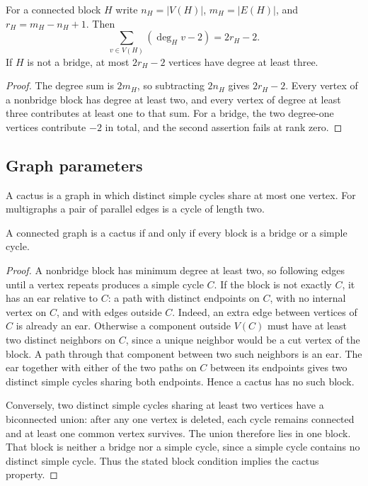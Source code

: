 \begin{lemma}
\label{lem:a-pre-degree}
For a connected block $H$ write $n_H=|V(H)|$, $m_H=|E(H)|$, and
$r_H=m_H-n_H+1$. Then
\[
 \sum_{v\in V(H)}(\deg_H v-2)=2r_H-2.
\]
If $H$ is not a bridge, at most $2r_H-2$ vertices have degree at least three.
\end{lemma}
\begin{proof}
The degree sum is $2m_H$, so subtracting $2n_H$ gives $2r_H-2$.
Every vertex of a nonbridge block has degree at least two, and every
vertex of degree at least three contributes at least one to that sum.
For a bridge, the two degree-one vertices contribute $-2$ in total,
and the second assertion fails at rank zero.
\end{proof}

\subsection{Graph parameters}
\label{subsec:a-pre-parameters}
A cactus is a graph in which distinct simple cycles share at most one
vertex. For multigraphs a pair of parallel edges is a cycle of length two.

\begin{lemma}
\label{lem:a-pre-cactus-blocks}
A connected graph is a cactus if and only if every block is a bridge
or a simple cycle.
\end{lemma}
\begin{proof}
A nonbridge block has minimum degree at least two, so following edges
until a vertex repeats produces a simple cycle $C$. If the block is
not exactly $C$, it has an ear relative to $C$: a path with distinct
endpoints on $C$, with no internal vertex on $C$, and with edges outside
$C$. Indeed, an extra edge between vertices of $C$ is already an
ear. Otherwise a component outside $V(C)$ must have at least two
distinct neighbors on $C$, since a unique neighbor would be a cut
vertex of the block. A path through that component between two such
neighbors is an ear. The ear together with either of the two paths
on $C$ between its endpoints gives two distinct simple cycles sharing
both endpoints. Hence a cactus has no such block.

Conversely, two distinct simple cycles sharing at least two vertices
have a biconnected union: after any one vertex is deleted, each cycle
remains connected and at least one common vertex survives. The union
therefore lies in one block. That block is neither a bridge nor a
simple cycle, since a simple cycle contains no distinct simple cycle.
Thus the stated block condition implies the cactus property.
\end{proof}

